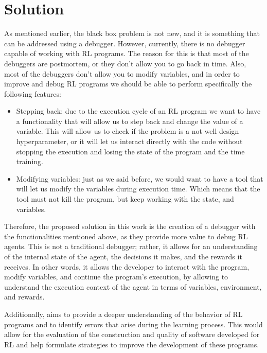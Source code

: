 
\chapter{Solution}
\label{cha:solution}

As mentioned earlier, the black box problem is not new, and it is something 
that can be addressed using a debugger. However, currently, there is no 
debugger capable of working with RL programs. The reason for this is that 
most of the debuggers are postmortem, or they don't allow you to go back in 
time. Also, most of the debuggers don't allow you to modify variables, and in 
order to improve and debug \ac{RL} programs we should be able to perform 
specifically the following features:

\begin{itemize}
    \item Stepping back: due to the execution cycle of an \ac{RL} program we 
    want to have a functionality that will allow us to step back and change 
    the value of a variable. This will allow us to check if the problem is a 
    not well design hyperparameter, or it will let us interact directly with 
    the code without stopping the execution and losing the state of the program 
    and the time training.
    \item Modifying variables: just as we said before, we would want to have a 
    tool that will let us modify the variables during execution time. Which means
    that the tool must not kill the program, but keep working with the state, 
    and variables.
\end{itemize}

Therefore, the proposed solution in this work is the creation of a debugger with the 
functionalities mentioned above, as they provide more value to debug \ac{RL} agents. This 
is not a traditional debugger; rather, it allows for an understanding of the 
internal state of the agent, the decisions it makes, and the rewards it 
receives. In other words, it allows the developer to interact with the program, modify
variables, and continue the program's execution, by allowing to understand 
the execution context of the agent in terms of variables, environment, and rewards. 

Additionally, aims to provide a deeper understanding of the behavior of 
RL programs and to identify errors that arise during the learning process. 
This would allow for the evaluation of the construction and quality of 
software developed for RL and help formulate strategies to improve the 
development of these programs.

